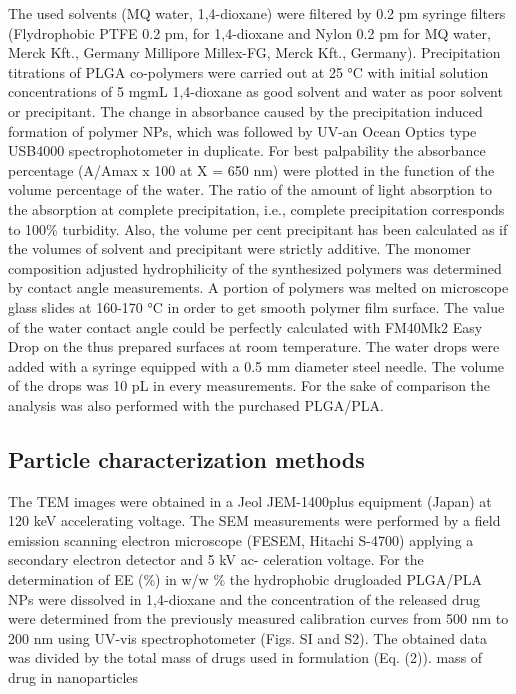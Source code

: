 \documentclass[11pt,letterpaper]{article}
\begin{document}
	The used solvents (MQ water, 1,4-dioxane) were filtered by 0.2 pm
	syringe filters (Flydrophobic  PTFE  0.2 pm, for 1,4-dioxane and Nylon
	0.2 pm for MQ water, Merck Kft., Germany Millipore Millex-FG, Merck
	Kft., Germany).
	Precipitation titrations of PLGA co-polymers were carried out at 25 °C with initial solution concentrations of 5 mgmL       1,4-dioxane as good solvent and water as poor solvent or precipitant. The change  in
	absorbance caused by the precipitation induced formation of polymer NPs, which was followed by UV-an Ocean Optics type USB4000 spectrophotometer in duplicate. For best palpability the absorbance percentage (A/Amax x 100 at  X  = 650 nm) were plotted in the function of the volume percentage of the water. The ratio of the amount of light absorption   to  the  absorption   at   complete  precipitation,   i.e., complete
	precipitation corresponds to 100\% turbidity. Also, the volume per cent
	precipitant has been calculated as if the volumes of solvent and precipitant were strictly additive. The monomer composition adjusted hydrophilicity of the synthesized polymers was determined by contact angle measurements. A portion of polymers was melted on  microscope
	glass slides at 160-170 °C in order to get smooth polymer film surface.
	The value of the water contact angle could be perfectly calculated with FM40Mk2 Easy Drop on the thus prepared surfaces at room temperature.  The  water  drops  were  added  with  a  syringe  equipped  with a
	0.5 mm diameter steel  needle. The volume of  the drops was 10 pL in
	every measurements. For the sake of comparison the analysis was also
	performed with the purchased PLGA/PLA.
	
	
	\subsection{Particle characterization methods}
	
	The TEM images were obtained in a Jeol JEM-1400plus equipment (Japan) at 120 keV accelerating voltage. The SEM measurements were performed by a field emission scanning electron microscope (FESEM, Hitachi S-4700) applying a secondary electron detector and 5 kV ac- celeration voltage.
	For the determination of EE (\%) in w/w \% the hydrophobic drugloaded PLGA/PLA NPs were dissolved in 1,4-dioxane and the concentration of the released drug were determined from the previously measured  calibration  curves  from  500 nm  to  200 nm  using  UV-vis spectrophotometer (Figs. SI and S2). The obtained data was divided by the total mass of drugs used in formulation (Eq. (2)).
	mass of drug in nanoparticles
	
\end{document}
